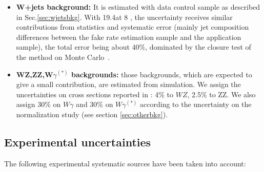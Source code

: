 \begin{itemize}
    \item {\bf\boldmath W+jets background:} It is estimated with data control
      sample as described in Sec.\ref{sec:wjetsbkg}. With 19.4\ifb at 8 \TeV,
      the uncertainty receives similar contributions from statistics
      and systematic error (mainly jet composition differences
      between the fake rate estimation sample and the application
      sample), the total error being about 40\%, dominated by the closure
      test of the method on Monte Carlo~\cite{AN-2013-022}.
 
    \item {\bf\boldmath WZ,ZZ,W$\gamma^{(*)}$ backgrounds:} those backgrounds, which are
      expected to give a small contribution, are estimated from
      simulation. We assign the uncertainties on cross sections
      reported in \cite{xsecSM,bib:ellis}: 4\% to $WZ$, 2.5\% to ZZ.
      We also assign 30\% on $W\gamma$ \cite{WgammaXsec} and 30\% on $W\gamma^{(*)}$ according 
      to the uncertainty on the normalization study (see section \ref{sec:otherbkg}).
      
  \end{itemize}

\subsection{Experimental uncertainties \label{subsec:expsyst}}

The following experimental systematic sources have been taken into account:

